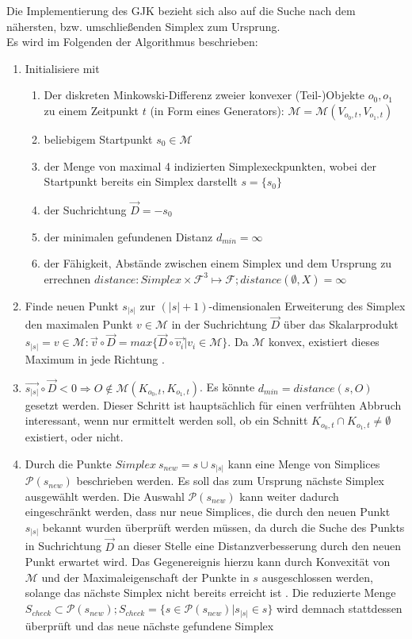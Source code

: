 Die Implementierung des GJK bezieht sich also auf die Suche nach dem nähersten, bzw. umschließenden Simplex zum Ursprung.\\
Es wird im Folgenden der Algorithmus beschrieben:
\begin{enumerate}
	\item Initialisiere mit
	\begin{enumerate}
		\item Der diskreten Minkowski-Differenz zweier konvexer (Teil-)Objekte $o_0, o_1$ zu einem Zeitpunkt $t$ (in Form eines Generators): $\mathcal{M} = \mathcal{M}(V_{o_0, t}, V_{o_1, t})$
		\item beliebigem Startpunkt $s_0 \in \mathcal{M}$
		\item der Menge von maximal 4 indizierten Simplexeckpunkten, wobei der Startpunkt bereits ein Simplex darstellt $s = \{s_0\}$
		\item der Suchrichtung $\vec{D} = -s_0$
		\item der minimalen gefundenen Distanz $d_{min} = \infty$
		\item der Fähigkeit, Abstände zwischen einem Simplex und dem Ursprung zu errechnen $distance: Simplex \times \mathcal{F}^3 \mapsto \mathcal{F} ; distance(\emptyset, X) = \infty$
	\end{enumerate}	
	\item Finde neuen Punkt $s_{|s|}$ zur $(|s|+1)$-dimensionalen Erweiterung des Simplex den maximalen Punkt $v \in \mathcal{M}$ in der Suchrichtung $\vec{D}$ über das Skalarprodukt $s_{|s|} = v \in \mathcal{M} : \vec{v} \circ \vec{D} = max\{\vec{D} \circ \vec{v_i}| v_i \in  \mathcal{M}\}$. Da $\mathcal{M}$ konvex, existiert dieses Maximum in jede Richtung \cite[p. 195]{gjk}.
	\item $\vec{s_{|s|}} \circ \vec{D} < 0 \Rightarrow O \notin \mathcal{M}(K_{o_0, t}, K_{o_1, t})$. Es könnte $d_{min} = distance(s, O)$ gesetzt werden. Dieser Schritt ist hauptsächlich für einen verfrühten Abbruch interessant, wenn nur ermittelt werden soll, ob ein Schnitt $K_{o_0, t} \cap K_{o_1, t} \neq \emptyset$ existiert, oder nicht.
	\item Durch die Punkte $Simplex~s_{new} = s \cup {s_{|s|}}$ kann eine Menge von Simplices $\mathcal{P}(s_{new})$ beschrieben werden. Es soll das zum Ursprung nächste Simplex ausgewählt werden. Die Auswahl $\mathcal{P}(s_{new})$ kann weiter dadurch eingeschränkt werden, dass nur neue Simplices, die durch den neuen Punkt $s_{|s|}$ bekannt wurden überprüft werden müssen, da durch die Suche des Punkts in Suchrichtung $\vec{D}$ an dieser Stelle eine Distanzverbesserung durch den neuen Punkt erwartet wird. Das Gegenereignis hierzu kann durch Konvexität von $\mathcal{M}$ und der Maximaleigenschaft der Punkte in $s$ ausgeschlossen werden, solange das nächste Simplex nicht bereits erreicht ist \cite{gjk-casey}.  Die reduzierte Menge $S_{check} \subset \mathcal{P}(s_{new}); S_{check} = \{ s \in \mathcal{P}(s_{new}) | s_{|s|} \in s \}$ wird demnach stattdessen überprüft und das neue nächste gefundene Simplex 

\end{enumerate}
